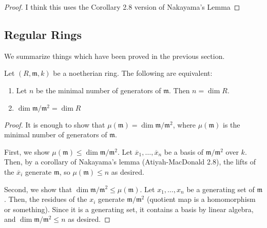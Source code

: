 \begin{proof}

  I think this uses the Corollary 2.8 version of Nakayama's Lemma
\end{proof}

\subsection{Regular Rings}

We summarize things which have been proved in the previous section.


\begin{proposition} \label{prop:regular_def_equiv}
	Let \((R,\mathfrak{m},k)\) be a noetherian ring. 
	The following are equivalent:
	\begin{enumerate}[label=(\alph*)]
		\item Let \(n\) be the minimal number of generators of
			\(\mathfrak{m}\).
			Then \(n = \dim R\).
		\item \(\dim \mathfrak{m} / \mathfrak{m}^{2}  = \dim R\)
	\end{enumerate}
\end{proposition}

\begin{proof}
	It is enough to show that 
	\(\mu(\mathfrak{m}) = \dim \mathfrak{m} / \mathfrak{m}^{2}\),
	where \(\mu(\mathfrak{m})\) is the minimal number of generators
	of \(\mathfrak{m}\).
	
	First, we show \(\mu(\mathfrak{m}) \leq \dim \mathfrak{m} / \mathfrak{m}^{2}\).
	Let \(\overline{x}_{1}, \ldots, \overline{x}_{n}\) 
	be a basis of \(\mathfrak{m} / \mathfrak{m}^{2}\) 
	over \(k\).
	Then, by a corollary of Nakayama's lemma (Atiyah-MacDonald 2.8),
	the lifts of the \(\overline{x}_{i}\) generate \(\mathfrak{m}\),
	so \(\mu(\mathfrak{m}) \leq n\) as desired.

	Second, we show that 
	\(\dim \mathfrak{m} / \mathfrak{m}^{2} \leq \mu(\mathfrak{m})\).
	Let \(x_{1}, \ldots, x_{n}\) be a generating set of 
	\(\mathfrak{m}\).
	Then, the residues of the \(x_{i}\) generate 
	\(\mathfrak{m} / \mathfrak{m}^{2}\) (quotient map is a 
	homomorphism or something).
	Since it is a generating set, it contains a basis by
	linear algebra, and
	\(\dim \mathfrak{m} / \mathfrak{m}^{2} \leq n\) as desired.
\end{proof}


